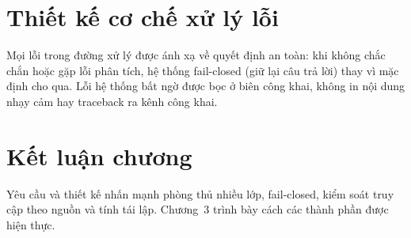 \section{Thiết kế cơ chế xử lý lỗi}

Mọi lỗi trong đường xử lý được ánh xạ về quyết định an toàn: khi không chắc chắn
hoặc gặp lỗi phân tích, hệ thống fail-closed (giữ lại câu trả lời) thay vì mặc
định cho qua. Lỗi hệ thống bất ngờ được bọc ở biên công khai, không in nội dung
nhạy cảm hay traceback ra kênh công khai.

\section{Kết luận chương}

Yêu cầu và thiết kế nhấn mạnh phòng thủ nhiều lớp, fail-closed, kiểm soát truy
cập theo nguồn và tính tái lập. Chương~3 trình bày cách các thành phần được hiện
thực.
